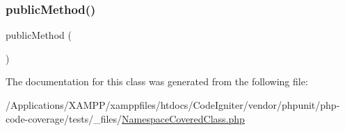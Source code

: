 \subsubsection{\texorpdfstring{public\+Method()}{publicMethod()}\hspace{0.1cm}{\footnotesize\ttfamily [2/2]}}
{\footnotesize\ttfamily public\+Method (\begin{DoxyParamCaption}{ }\end{DoxyParamCaption})}



The documentation for this class was generated from the following file\+:\begin{DoxyCompactItemize}
\item 
/\+Applications/\+X\+A\+M\+P\+P/xamppfiles/htdocs/\+Code\+Igniter/vendor/phpunit/php-\/code-\/coverage/tests/\+\_\+files/\mbox{\hyperlink{php-code-coverage_2tests_2__files_2_namespace_covered_class_8php}{Namespace\+Covered\+Class.\+php}}\end{DoxyCompactItemize}
